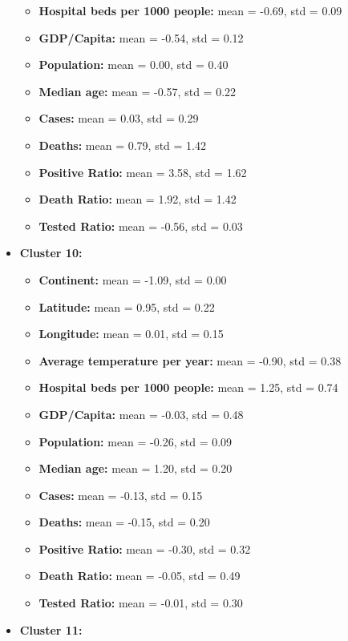 \documentclass[12pt,a4paper]{article}
\begin{document}
\begin{itemize}
\begin{itemize}
            \item \textbf{Hospital beds per 1000 people:} mean = -0.69, std = 0.09
            \item \textbf{GDP/Capita:} mean = -0.54, std = 0.12
            \item \textbf{Population:} mean = 0.00, std = 0.40
            \item \textbf{Median age:} mean = -0.57, std = 0.22
            \item \textbf{Cases:} mean = 0.03, std = 0.29
            \item \textbf{Deaths:} mean = 0.79, std = 1.42
            \item \textbf{Positive Ratio:} mean = 3.58, std = 1.62
            \item \textbf{Death Ratio:} mean = 1.92, std = 1.42
            \item \textbf{Tested Ratio:} mean = -0.56, std = 0.03
        \end{itemize}
    \item \textbf{Cluster 10:} 
        \begin{itemize}
            \item \textbf{Continent:} mean = -1.09, std = 0.00
            \item \textbf{Latitude:} mean = 0.95, std = 0.22
            \item \textbf{Longitude:} mean = 0.01, std = 0.15
            \item \textbf{Average temperature per year:} mean = -0.90, std = 0.38
            \item \textbf{Hospital beds per 1000 people:} mean = 1.25, std = 0.74
            \item \textbf{GDP/Capita:} mean = -0.03, std = 0.48
            \item \textbf{Population:} mean = -0.26, std = 0.09
            \item \textbf{Median age:} mean = 1.20, std = 0.20
            \item \textbf{Cases:} mean = -0.13, std = 0.15
            \item \textbf{Deaths:} mean = -0.15, std = 0.20
            \item \textbf{Positive Ratio:} mean = -0.30, std = 0.32
            \item \textbf{Death Ratio:} mean = -0.05, std = 0.49
            \item \textbf{Tested Ratio:} mean = -0.01, std = 0.30
        \end{itemize}
    \item \textbf{Cluster 11:} 

\end{itemize}
\end{document}
